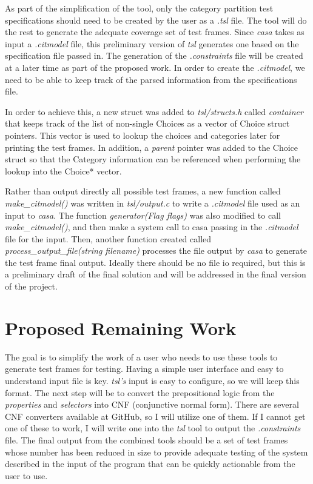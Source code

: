 \documentclass[a4full,12pt]{article}
\begin{document}
As part of the simplification of the tool, only the category partition test specifications
  should need to be created by the user as a \emph{.tsl} file. The tool will do the rest to
  generate the adequate coverage set of test frames. Since \emph{casa} takes as input a 
  \emph{.citmodel} file, this preliminary version of \emph{tsl} generates one based on the
  specification file passed in. The generation of the \emph{.constraints} file will be created
  at a later time as part of the proposed work. In order to create the \emph{.citmodel}, we need
  to be able to keep track of the parsed information from the specifications file.
  
In order to achieve this, a new struct was added to \emph{tsl/structs.h} called \emph{container} that
  keeps track of the list of non-single Choices as a vector of Choice struct
  pointers. This vector is used to lookup the choices and categories later for
  printing the test frames. In addition, a \emph{parent} pointer was added to
  the Choice struct so that the Category information can be referenced when
  performing the lookup into the Choice* vector.
  
Rather than output directly all possible test frames, a new function called
  \emph{make\_citmodel()} was written in \emph{tsl/output.c} to write a 
  \emph{.citmodel} file used as an input to \emph{casa}. The function
  \emph{generator(Flag flags)} was also modified to call \emph{make\_citmodel()},
  and then make a system call to casa passing in the \emph{.citmodel} file for
  the input. Then, another function created  called
  \emph{process\_output\_file(string filename)} processes the file output by
  \emph{casa} to generate the test frame final output. Ideally there should be
  no file io required, but this is a preliminary draft of the final solution
  and will be addressed in the final version of the project.
  
  \section{Proposed Remaining Work}
The goal is to simplify the work of a user who needs to use these tools to generate test frames
  for testing. Having a simple user interface and easy to understand input file is key. \emph{tsl's}
  input is easy to configure, so we will keep this format. The next step will be to convert the
  prepositional logic from the \emph{properties} and \emph{selectors} into CNF (conjunctive normal
  form). There are several CNF converters available at GitHub, so I will utilize one of them. If
  I cannot get one of these to work, I will write one into the \emph{tsl} tool to output the
  \emph{.constraints} file. The final output from the combined tools should be a set of test
  frames whose number has been reduced in size to provide adequate testing of the system described
  in the input of the program that can be quickly actionable from the user to use.
  
\end{document}
